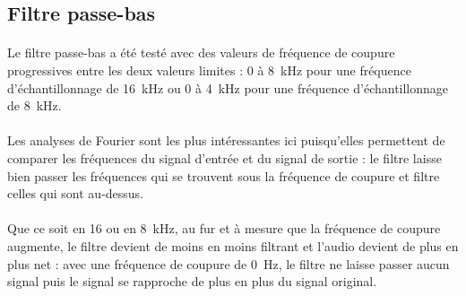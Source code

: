 \documentclass{article}
\begin{document}
    \subsection{Filtre passe-bas}
    \paragraph{}
    Le filtre passe-bas a été testé avec des valeurs de fréquence de coupure progressives entre les deux valeurs limites : 0 à \SI{8}{\kilo\hertz} pour une fréquence d'échantillonnage de \SI{16}{\kilo\hertz} ou 0 à \SI{4}{\kilo\hertz} pour une fréquence d'échantillonnage de \SI{8}{\kilo\hertz}.

    \paragraph{}
    Les analyses de Fourier sont les plus intéressantes ici puisqu'elles permettent de comparer les fréquences du signal d'entrée et du signal de sortie : le filtre laisse bien passer les fréquences qui se trouvent sous la fréquence de coupure et filtre celles qui sont au-dessus.

    \paragraph{}
    Que ce soit en 16 ou en \SI{8}{\kilo\hertz}, au fur et à mesure que la fréquence de coupure augmente, le filtre devient de moins en moins filtrant et l'audio devient de plus en plus net : avec une fréquence de coupure de \SI{0}{\hertz}, le filtre ne laisse passer aucun signal puis le signal se rapproche de plus en plus du signal original.
\end{document}
